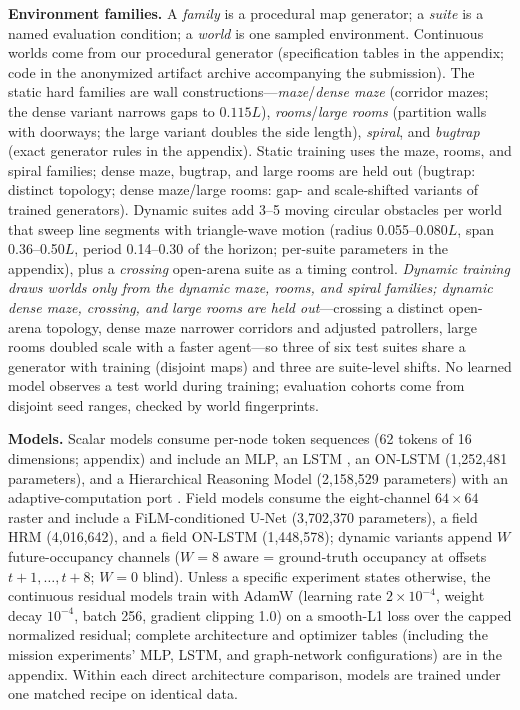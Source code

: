\documentclass[letterpaper]{article} %
\begin{document}
\textbf{Environment families.} A \emph{family} is a procedural map generator; a \emph{suite} is a named evaluation condition; a \emph{world} is one sampled environment. Continuous worlds come from our procedural generator (specification tables in the appendix; code in the anonymized artifact archive accompanying the submission). The static hard families are wall constructions---\emph{maze}/\emph{dense maze} (corridor mazes; the dense variant narrows gaps to $0.115L$), \emph{rooms}/\emph{large rooms} (partition walls with doorways; the large variant doubles the side length), \emph{spiral}, and \emph{bugtrap} (exact generator rules in the appendix). Static training uses the maze, rooms, and spiral families; dense maze, bugtrap, and large rooms are held out (bugtrap: distinct topology; dense maze/large rooms: gap- and scale-shifted variants of trained generators). Dynamic suites add 3--5 moving circular obstacles per world that sweep line segments with triangle-wave motion (radius 0.055--0.080$L$, span 0.36--0.50$L$, period 0.14--0.30 of the horizon; per-suite parameters in the appendix), plus a \emph{crossing} open-arena suite as a timing control. \emph{Dynamic training draws worlds only from the dynamic maze, rooms, and spiral families; dynamic dense maze, crossing, and large rooms are held out}---crossing a distinct open-arena topology, dense maze narrower corridors and adjusted patrollers, large rooms doubled scale with a faster agent---so three of six test suites share a generator with training (disjoint maps) and three are suite-level shifts. No learned model observes a test world during training; evaluation cohorts come from disjoint seed ranges, checked by world fingerprints.

\textbf{Models.} Scalar models consume per-node token sequences (62 tokens of 16 dimensions; appendix) and include an MLP, an LSTM \citep{hochreiter1997lstm}, an ON-LSTM \citep{shen2019onlstm} (1{,}252{,}481 parameters), and a Hierarchical Reasoning Model \citep[HRM;][]{wang2025hrm} (2{,}158{,}529 parameters) with an adaptive-computation port \citep{graves2016act,banino2021pondernet}. Field models consume the eight-channel $64{\times}64$ raster and include a FiLM-conditioned U-Net \citep{ronneberger2015unet,perez2018film} (3{,}702{,}370 parameters), a field HRM (4{,}016{,}642), and a field ON-LSTM (1{,}448{,}578); dynamic variants append $W$ future-occupancy channels ($W{=}8$ aware = ground-truth occupancy at offsets $t{+}1,\ldots,t{+}8$; $W{=}0$ blind). Unless a specific experiment states otherwise, the continuous residual models train with AdamW (learning rate $2{\times}10^{-4}$, weight decay $10^{-4}$, batch 256, gradient clipping 1.0) on a smooth-L1 loss over the capped normalized residual; complete architecture and optimizer tables (including the mission experiments' MLP, LSTM, and graph-network configurations) are in the appendix. Within each direct architecture comparison, models are trained under one matched recipe on identical data.
\end{document}
